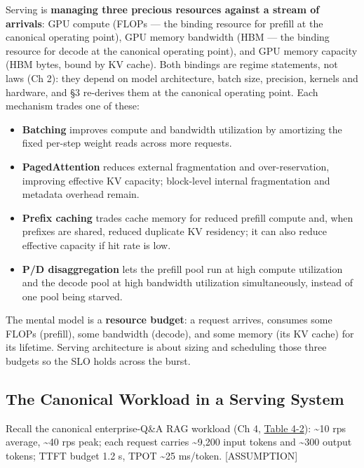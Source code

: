 \label{mental-model}


Serving is \textbf{managing three precious resources against a stream of
arrivals}: GPU compute (FLOPs --- the binding resource for prefill at
the canonical operating point), GPU memory bandwidth (HBM --- the
binding resource for decode at the canonical operating point), and GPU
memory capacity (HBM bytes, bound by KV cache). Both bindings are regime
statements, not laws (Ch 2): they depend on model architecture, batch
size, precision, kernels and hardware, and §3 re-derives them at the
canonical operating point. Each mechanism trades one of these:

\begin{itemize}
\tightlist
\item
  \textbf{Batching} improves compute and bandwidth utilization by
  amortizing the fixed per-step weight reads across more requests.
\item
  \textbf{PagedAttention} reduces external fragmentation and
  over-reservation, improving effective KV capacity; block-level
  internal fragmentation and metadata overhead remain.
\item
  \textbf{Prefix caching} trades cache memory for reduced prefill
  compute and, when prefixes are shared, reduced duplicate KV residency;
  it can also reduce effective capacity if hit rate is low.
\item
  \textbf{P/D disaggregation} lets the prefill pool run at high compute
  utilization and the decode pool at high bandwidth utilization
  simultaneously, instead of one pool being starved.
\end{itemize}

The mental model is a \textbf{resource budget}: a request arrives,
consumes some FLOPs (prefill), some bandwidth (decode), and some memory
(its KV cache) for its lifetime. Serving architecture is about sizing
and scheduling those three budgets so the SLO holds across the burst.

\label{worked-example}


\subsection{The Canonical Workload in a Serving
System}\label{the-canonical-workload-in-a-serving-system}

Recall the canonical enterprise-Q\&A RAG workload (Ch 4, \hyperref[tab:4.2]{Table 4-2}):
\textasciitilde10 rps average, \textasciitilde40 rps peak; each request
carries \textasciitilde9,200 input tokens and \textasciitilde300 output
tokens; TTFT budget 1.2 s, TPOT \textasciitilde25 ms/token.
\mbox{{[}ASSUMPTION{]}}

